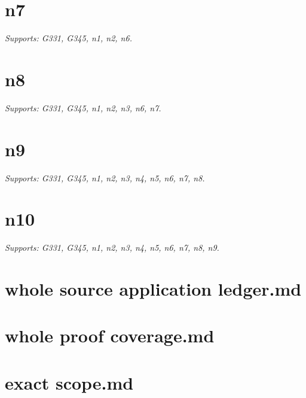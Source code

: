 \documentclass[11pt]{article}
\begin{document}
\section{n7}
\textit{Supports: G331, G345, n1, n2, n6.}
\begin{ReviewBody}
\end{ReviewBody}

\section{n8}
\textit{Supports: G331, G345, n1, n2, n3, n6, n7.}
\begin{ReviewBody}
\end{ReviewBody}

\section{n9}
\textit{Supports: G331, G345, n1, n2, n3, n4, n5, n6, n7, n8.}
\begin{ReviewBody}
\end{ReviewBody}

\section{n10}
\textit{Supports: G331, G345, n1, n2, n3, n4, n5, n6, n7, n8, n9.}
\begin{ReviewBody}
\end{ReviewBody}

\section{whole source application ledger.md}
\begin{ReviewBody}
\end{ReviewBody}

\section{whole proof coverage.md}
\begin{ReviewBody}
\end{ReviewBody}

\section{exact scope.md}
\begin{ReviewBody}
\end{ReviewBody}
\end{document}
